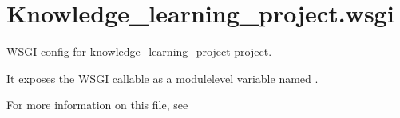 \documentclass[letterpaper,10pt,english]{sphinxmanual}
\begin{document}
\section{Knowledge\_learning\_project.wsgi}
\label{\detokenize{knowledge_learning_project:module-knowledge_learning_project.wsgi}}\label{\detokenize{knowledge_learning_project:knowledge-learning-project-wsgi}}
\sphinxAtStartPar
WSGI config for knowledge\_learning\_project project.

\sphinxAtStartPar
It exposes the WSGI callable as a module\sphinxhyphen{}level variable named .

\sphinxAtStartPar
For more information on this file, see
\end{document}
